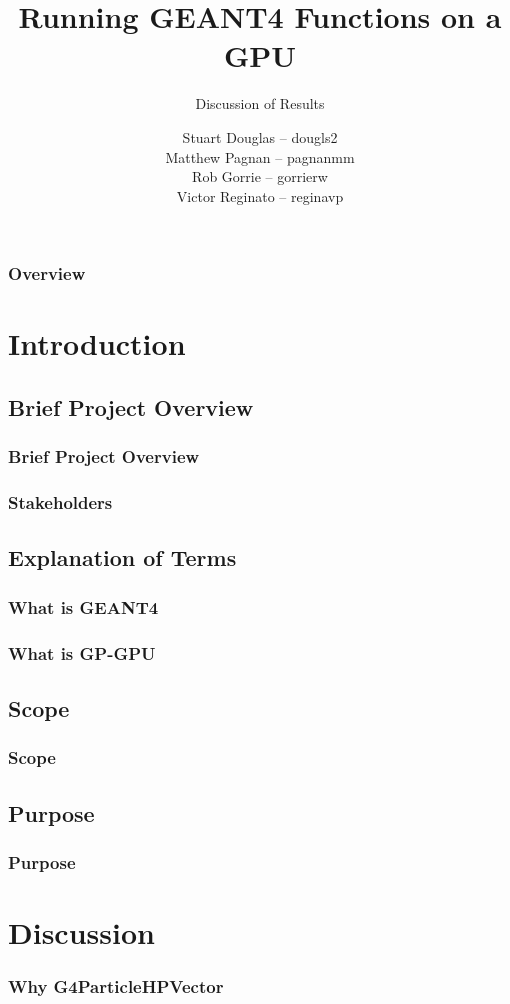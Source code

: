 \documentclass{beamer}
\title[GEANT4-GPU (McMaster University)]{Running GEANT4 Functions on a GPU}
\subtitle{Discussion of Results}
\institute{McMaster University}
\author[S. Douglas, M .Pagnan, R. Gorrie, V. Reginato]{
Stuart Douglas -- dougls2
\\Matthew Pagnan -- pagnanmm
\\Rob Gorrie -- gorrierw
\\Victor Reginato -- reginavp
}
\begin{document}
\frame{\titlepage}
\begin{frame}
\frametitle{Overview}
\tableofcontents
\end{frame}

\section{Introduction} 

\subsection{Brief Project Overview}
\begin{frame}
\frametitle{Brief Project Overview}
\end{frame}

\begin{frame}
\frametitle{Stakeholders}
\end{frame}

\subsection{Explanation of Terms}
\begin{frame}
\frametitle{What is GEANT4}
\end{frame}

\begin{frame}
\frametitle{What is GP-GPU}
\end{frame}

\subsection{Scope}
\begin{frame}
\frametitle{Scope}
\end{frame}

\subsection{Purpose}
\begin{frame}
\frametitle{Purpose}
\end{frame}

\section{Discussion}

\begin{frame}
\frametitle{Why G4ParticleHPVector}
\end{frame}
\end{document}
